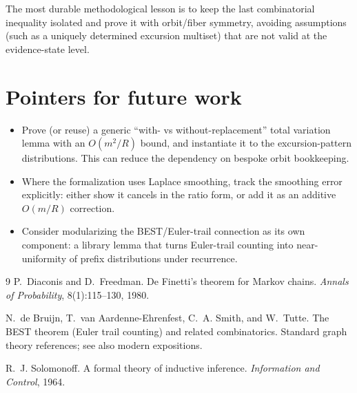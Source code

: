 \documentclass[11pt]{article}
\begin{document}
The most durable methodological lesson is to keep the last combinatorial inequality isolated and
prove it with orbit/fiber symmetry, avoiding assumptions (such as a uniquely determined excursion
multiset) that are not valid at the evidence-state level.

\section*{Pointers for future work}

\begin{itemize}
\item Prove (or reuse) a generic ``with- vs without-replacement'' total variation lemma with an
$O(m^2/R)$ bound, and instantiate it to the excursion-pattern distributions. This can reduce the
dependency on bespoke orbit bookkeeping.
\item Where the formalization uses Laplace smoothing, track the smoothing error explicitly:
either show it cancels in the ratio form, or add it as an additive $O(m/R)$ correction.
\item Consider modularizing the BEST/Euler-trail connection as its own component: a library lemma
that turns Euler-trail counting into near-uniformity of prefix distributions under recurrence.
\end{itemize}


\begin{thebibliography}{9}
P.~Diaconis and D.~Freedman.
\newblock De Finetti's theorem for Markov chains.
\newblock \emph{Annals of Probability}, 8(1):115--130, 1980.

N.~de Bruijn, T.~van Aardenne-Ehrenfest, C.~A. Smith, and W.~Tutte.
\newblock The BEST theorem (Euler trail counting) and related combinatorics.
\newblock Standard graph theory references; see also modern expositions.

R.~J. Solomonoff.
\newblock A formal theory of inductive inference.
\newblock \emph{Information and Control}, 1964.

\end{thebibliography}
\end{document}
